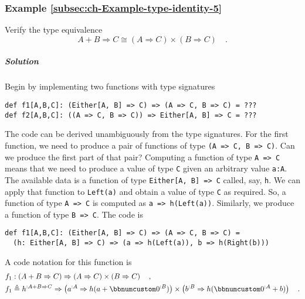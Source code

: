 \subsubsection{Example \label{subsec:ch-Example-type-identity-5}\ref{subsec:ch-Example-type-identity-5}}

Verify the type equivalence 
\[
A+B\Rightarrow C\cong(A\Rightarrow C)\times(B\Rightarrow C)\quad.
\]


\subparagraph{Solution}

Begin by implementing two functions with type signatures
\begin{lstlisting}
def f1[A,B,C]: (Either[A, B] => C) => (A => C, B => C) = ???
def f2[A,B,C]: ((A => C, B => C)) => Either[A, B] => C = ???
\end{lstlisting}
The code can be derived unambiguously from the type signatures. For
the first function, we need to produce a pair of functions of type
\lstinline!(A => C, B => C)!. Can we produce the first part of that
pair? Computing a function of type \lstinline!A => C! means that
we need to produce a value of type \lstinline!C! given an arbitrary
value \lstinline!a:A!. The available data is a function of type \lstinline!Either[A, B] => C!
called, say, \lstinline!h!. We can apply that function to \lstinline!Left(a)!
and obtain a value of type \lstinline!C! as required. So, a function
of type \lstinline!A => C! is computed as \lstinline!a => h(Left(a))!.
Similarly, we produce a function of type \lstinline!B => C!. The
code is
\begin{lstlisting}
def f1[A,B,C]: (Either[A, B] => C) => (A => C, B => C) =
  (h: Either[A, B] => C) => (a => h(Left(a)), b => h(Right(b)))
\end{lstlisting}
A code notation for this function is
\begin{align*}
 & f_{1}:\left(A+B\Rightarrow C\right)\Rightarrow\left(A\Rightarrow C\right)\times\left(B\Rightarrow C\right)\quad,\\
 & f_{1}\triangleq h^{:A+B\Rightarrow C}\Rightarrow\left(a^{:A}\Rightarrow h(a+\bbnum 0^{:B})\right)\times\left(b^{:B}\Rightarrow h(\bbnum 0^{:A}+b)\right)\quad.
\end{align*}

